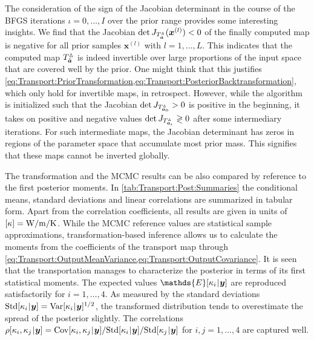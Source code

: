 \par %
The consideration of the sign of the Jacobian determinant in the course of the BFGS iterations \(\iota = 0,\ldots,I\) over the prior range provides some interesting insights.
We find that the Jacobian \(\det J_{T^\vartriangle_{\hat{\bm{a}}}}(\bm{x}^{(l)}) < 0\) of the finally computed map is negative for all prior samples \(\bm{x}^{(l)}\) with \(l=1,\ldots,L\).
This indicates that the computed map \(T^\vartriangle_{\hat{\bm{a}}}\) is indeed invertible over large proportions of the input space that are covered well by the prior.
One might think that this justifies \cref{eq:Transport:PriorTransformation,eq:Transport:PosteriorBacktransformation}, which only hold for invertible maps, in retrospect.
However, while the algorithm is initialized such that the Jacobian \(\det J_{T^\vartriangle_{\bm{a}_0}} > 0\) is positive in the beginning,
it takes on positive and negative values \(\det J_{T^\vartriangle_{\bm{a}_\iota}} \gtrless 0\) after some intermediary iterations.
For such intermediate maps, the Jacobian determinant has zeros in regions of the parameter space that accumulate most prior mass.
This signifies that these maps cannot be inverted globally.
\par %
The transformation and the MCMC results can be also compared by reference to the first posterior moments.
In \cref{tab:Transport:Post:Summaries} the conditional means, standard deviations and linear correlations are summarized in tabular form.
Apart from the correlation coefficients, all results are given in units of \([\kappa] = \unit[]{W/m/K}\).
While the MCMC reference values are statistical sample approximations, transformation-based inference allows us to calculate
the moments from the coefficients of the transport map through \cref{eq:Transport:OutputMeanVariance,eq:Transport:OutputCovariance}.
It is seen that the transportation manages to characterize the posterior in terms of its first statistical moments.
The expected values \(\mathds{E}[\kappa_i \cond \bm{y}]\) are reproduced satisfactorily for \(i=1,\ldots,4\).
As measured by the standard deviations \(\mathrm{Std}[\kappa_i {\:\!}|{\:\!} \bm{y}] = \mathrm{Var}[\kappa_i {\:\!}|{\:\!} \bm{y}]^{1/2}\),
the transformed distribution tends to overestimate the spread of the posterior slightly.
The correlations \(\rho[\kappa_i,\kappa_j \cond \bm{y}] = \mathrm{Cov}[\kappa_i,\kappa_j \cond \bm{y}] / \mathrm{Std}[\kappa_i \cond \bm{y}] / \mathrm{Std}[\kappa_j \cond \bm{y}]\)
for \(i,j=1,\ldots,4\) are captured well.
